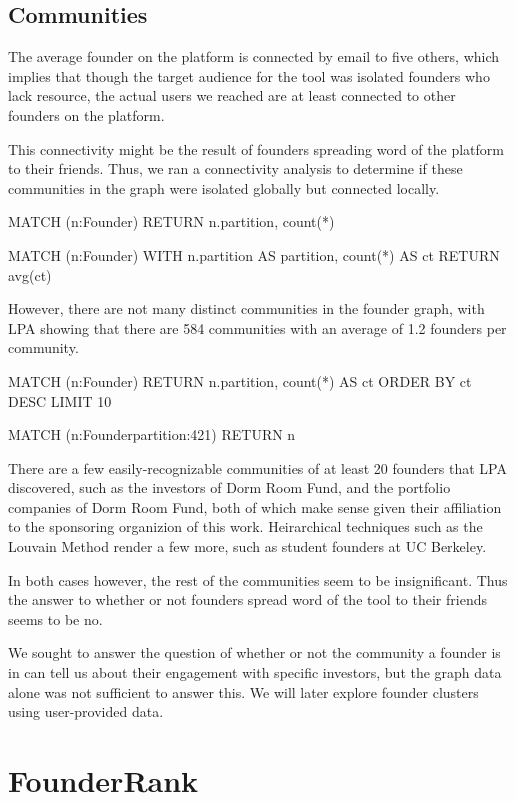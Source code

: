 \subsection{Communities}

The average founder on the platform is connected by email to five others, which implies that though the target audience for the tool was isolated founders who lack resource, the actual users we reached are at least connected to other founders on the platform.

This connectivity might be the result of founders spreading word of the platform to their friends. Thus, we ran a connectivity analysis to determine if these communities in the graph were isolated globally but connected locally.

MATCH (n:Founder)
RETURN n.partition, count(*)

MATCH (n:Founder)
WITH n.partition AS partition, count(*) AS ct
RETURN avg(ct)

However, there are not many distinct communities in the founder graph, with LPA \cite{2007PhRvE..76c6106R} showing that there are 584 communities with an average of 1.2 founders per community.

MATCH (n:Founder)
RETURN n.partition, count(*) AS ct
ORDER BY ct DESC
LIMIT 10

MATCH (n:Founder{partition:421})
RETURN n

There are a few easily-recognizable communities of at least 20 founders that LPA discovered, such as the investors of Dorm Room Fund, and the portfolio companies of Dorm Room Fund, both of which make sense given their affiliation to the sponsoring organizion of this work. Heirarchical techniques such as the Louvain Method render a few more, such as student founders at UC Berkeley.

In both cases however, the rest of the communities seem to be insignificant. Thus the answer to whether or not founders spread word of the tool to their friends seems to be no.

We sought to answer the question of whether or not the community a founder is in can tell us about their engagement with specific investors, but the graph data alone was not sufficient to answer this. We will later explore founder clusters using user-provided data.

\section{FounderRank}

